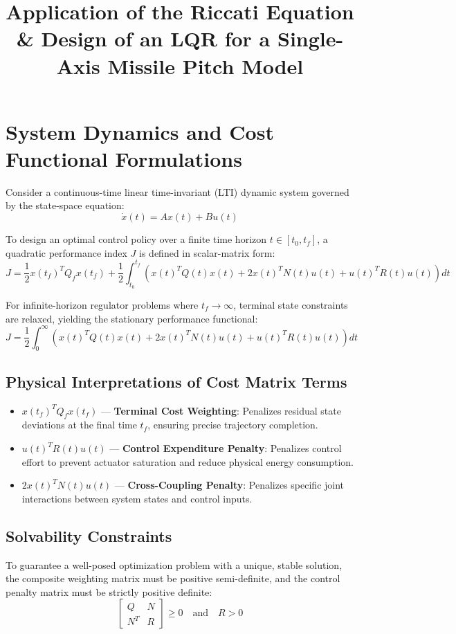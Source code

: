 \documentclass[11pt, a4paper]{article}
\title{\textbf{Application of the Riccati Equation \& Design of an LQR for a Single-Axis Missile Pitch Model}}
\author{}
\date{}
\begin{document}
\maketitle

\section{System Dynamics and Cost Functional Formulations}

Consider a continuous-time linear time-invariant (LTI) dynamic system governed by the state-space equation:
\begin{equation}
\dot{x}(t) = A x(t) + B u(t)
\end{equation}

To design an optimal control policy over a finite time horizon $t \in [t_0, t_f]$, a quadratic performance index $J$ is defined in scalar-matrix form:
\begin{equation}
J = \frac{1}{2} x(t_f)^T Q_f x(t_f) + \frac{1}{2} \int_{t_0}^{t_f} \left( x(t)^T Q(t) x(t) + 2 x(t)^T N(t) u(t) + u(t)^T R(t) u(t) \right) dt
\end{equation}

For infinite-horizon regulator problems where $t_f \to \infty$, terminal state constraints are relaxed, yielding the stationary performance functional:
\begin{equation}
J = \frac{1}{2} \int_{0}^{\infty} \left( x(t)^T Q(t) x(t) + 2 x(t)^T N(t) u(t) + u(t)^T R(t) u(t) \right) dt
\end{equation}

\subsection*{Physical Interpretations of Cost Matrix Terms}
\begin{itemize}
    \item $x(t_f)^T Q_f x(t_f)$ --- \textbf{Terminal Cost Weighting}: Penalizes residual state deviations at the final time $t_f$, ensuring precise trajectory completion.
    \item $u(t)^T R(t) u(t)$ --- \textbf{Control Expenditure Penalty}: Penalizes control effort to prevent actuator saturation and reduce physical energy consumption.
    \item $2 x(t)^T N(t) u(t)$ --- \textbf{Cross-Coupling Penalty}: Penalizes specific joint interactions between system states and control inputs.
\end{itemize}

\subsection*{Solvability Constraints}
To guarantee a well-posed optimization problem with a unique, stable solution, the composite weighting matrix must be positive semi-definite, and the control penalty matrix must be strictly positive definite:
\begin{equation}
\begin{bmatrix} Q & N \\ N^T & R \end{bmatrix} \ge 0 \quad \text{and} \quad R > 0
\end{equation}
\end{document}
